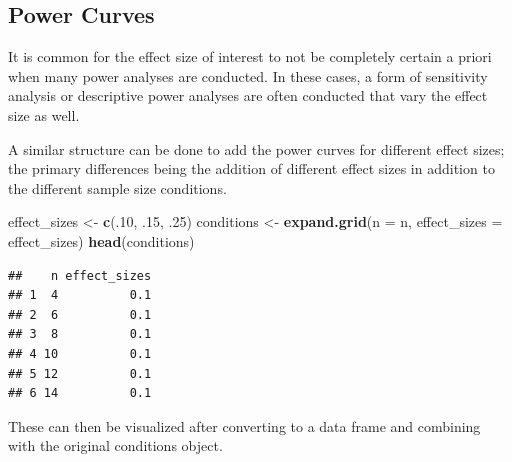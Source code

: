 \documentclass[man]{apa6}
\newenvironment{Shaded}{\begin{snugshade}}{\end{snugshade}}
\newcommand{\ControlFlowTok}[1]{\textcolor[rgb]{0.13,0.29,0.53}{\textbf{#1}}}
\newcommand{\DataTypeTok}[1]{\textcolor[rgb]{0.13,0.29,0.53}{#1}}
\newcommand{\DecValTok}[1]{\textcolor[rgb]{0.00,0.00,0.81}{#1}}
\newcommand{\FloatTok}[1]{\textcolor[rgb]{0.00,0.00,0.81}{#1}}
\newcommand{\KeywordTok}[1]{\textcolor[rgb]{0.13,0.29,0.53}{\textbf{#1}}}
\newcommand{\NormalTok}[1]{#1}
\newcommand{\OperatorTok}[1]{\textcolor[rgb]{0.81,0.36,0.00}{\textbf{#1}}}
\newcommand{\StringTok}[1]{\textcolor[rgb]{0.31,0.60,0.02}{#1}}
\begin{document}
\hypertarget{power-curves}{%
\subsection{Power Curves}\label{power-curves}}

It is common for the effect size of interest to not be completely certain a priori when many power analyses are conducted. In these cases, a form of sensitivity analysis or descriptive power analyses are often conducted that vary the effect size as well.

A similar structure can be done to add the power curves for different effect sizes; the primary differences being the addition of different effect sizes in addition to the different sample size conditions.

\begin{Shaded}
\begin{Highlighting}[]
\NormalTok{effect_sizes <-}\StringTok{ }\KeywordTok{c}\NormalTok{(.}\DecValTok{10}\NormalTok{, }\FloatTok{.15}\NormalTok{, }\FloatTok{.25}\NormalTok{)}
\NormalTok{conditions <-}\StringTok{ }\KeywordTok{expand.grid}\NormalTok{(}\DataTypeTok{n =}\NormalTok{ n, }\DataTypeTok{effect_sizes =}\NormalTok{ effect_sizes)}
\KeywordTok{head}\NormalTok{(conditions)}
\end{Highlighting}
\end{Shaded}

\begin{verbatim}
##    n effect_sizes
## 1  4          0.1
## 2  6          0.1
## 3  8          0.1
## 4 10          0.1
## 5 12          0.1
## 6 14          0.1
\end{verbatim}

\begin{Shaded}
\end{Shaded}

These can then be visualized after converting to a data frame and combining with the original conditions object.
\end{document}
